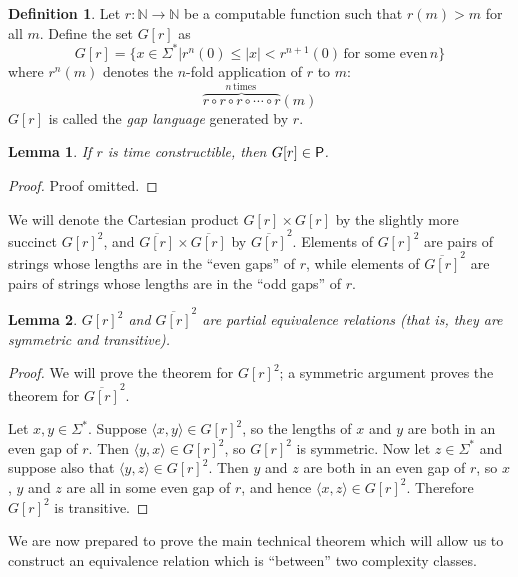 \documentclass[draft]{article}
\newtheorem{lemma}[lemma]{Lemma}
\theoremstyle{definition} \newtheorem{openproblem}[openproblem]{Open problem}
\theoremstyle{definition} \newtheorem{definition}[definition]{Definition}
\newcommand{\plain}[1]{\,\text{#1}\,} %
\newcommand{\defn}[1]{\emph{#1}} %
\newcommand{\pair}[2]{\langle#1,#2\rangle} %
\begin{document}
\begin{definition}
  Let $r\colon\mathbb{N}\to\mathbb{N}$ be a computable function such that $r(m)>m$ for all $m$.
  Define the set $G[r]$ as
  \begin{displaymath}
    G[r]=\{x\in\Sigma^*|r^n(0)\leq|x|<r^{n+1}(0) \plain{for some even} n\}
  \end{displaymath}
  where $r^n(m)$ denotes the $n$-fold application of $r$ to $m$:
  \begin{displaymath}
    \overbrace{r\circ r\circ r\circ\cdots\circ r}^{n \plain{times}}(m)
  \end{displaymath}
  $G[r]$ is called the \defn{gap language} generated by $r$.
\end{definition}

\begin{lemma}\label{lem:gap_p}
  If $r$ is time constructible, then $G[r]\in\P$.
\end{lemma}
\begin{proof}
  Proof omitted.
\end{proof}

We will denote the Cartesian product $G[r]\times G[r]$ by the slightly more succinct ${G[r]}^2$, and $\overline{G[r]}\times\overline{G[r]}$ by $\overline{G[r]}^2$.
Elements of ${G[r]}^2$ are pairs of strings whose lengths are in the ``even gaps'' of $r$, while elements of $\overline{G[r]}^2$ are pairs of strings whose lengths are in the ``odd gaps'' of $r$.

\begin{lemma}
  ${G[r]}^2$ and $\overline{G[r]}^2$ are \defn{partial equivalence relations} (that is, they are symmetric and transitive).
\end{lemma}
\begin{proof}
  We will prove the theorem for ${G[r]}^2$; a symmetric argument proves the theorem for $\overline{G[r]}^2$.

  Let $x,y\in\Sigma^*$.
  Suppose $\pair{x}{y}\in {G[r]}^2$, so the lengths of $x$ and $y$ are both in an even gap of $r$.
  Then $\pair{y}{x}\in{G[r]}^2$, so ${G[r]}^2$ is symmetric.
  Now let $z\in\Sigma^*$ and suppose also that $\pair{y}{z}\in {G[r]}^2$.
  Then $y$ and $z$ are both in an even gap of $r$, so $x$, $y$ and $z$ are all in some even gap of $r$, and hence $\pair{x}{z}\in {G[r]}^2$.
  Therefore ${G[r]}^2$ is transitive.
\end{proof}

We are now prepared to prove the main technical theorem which will allow us to construct an equivalence relation which is ``between'' two complexity classes.
\end{document}
